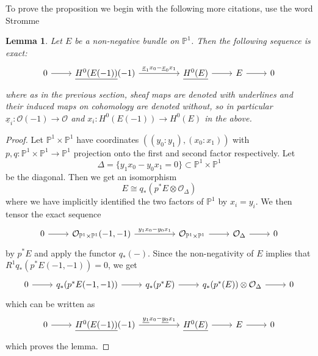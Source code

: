 \documentclass{amsart}
\newtheorem{lemma}[theorem]{Lemma}
\theoremstyle{definition}
\newcommand{\PP}{\mathbb{P}}
\newcommand{\OO}{\mathcal{O}}
\newcommand{\UL}[1]{\underline{#1}}
\begin{document}
To prove the proposition we begin with the following {\color{red} more
citations, use the word Stromme} 
\begin{lemma}\label{lem: Stromme}
Let $E$ be a non-negative bundle on $\PP^{1}$. Then the following
sequence is exact:
\[
\begin{tikzcd}
0\arrow{r} & \UL{H^{0}(E(-1))}(-1)
\arrow{rr}{\UL{x}_{1}x_{0}-\UL{x}_{0}x_{1}}& &
\UL{H^{0}(E)} \arrow{r} & E\arrow[r] & 0
\end{tikzcd}
\]
where as in the previous section, sheaf maps are denoted with
underlines and their induced maps on cohomology are denoted without,
so in particular $\UL{x}_{i}:\OO (-1)\to \OO$ and
$x_{i}:H^{0}(E(-1))\to H^{0}(E)$ in the above.
\end{lemma}
\begin{proof}
Let $\PP^{1}\times \PP^{1}$ have coordinates
$((y_{0}:y_{1}),(x_{0}:x_{1}))$ with $p,q:\PP^{1}\times \PP^{1}\to
\PP^{1}$ projection onto the first and second factor respectively. Let 
\[
\Delta =\{y_{1}x_{0}-y_{0}x_{1} =0 \}\subset \PP^{1}\times \PP^{1}
\]
be the diagonal. Then we get an isomorphism
\[
E\cong q_{*}\left(p^{*}E\otimes \OO_{\Delta} \right)
\]
where we have implicitly identified the two factors of $\PP^{1}$ by
$x_{i}=y_{i}$.  We then tensor the exact sequence
\[
\begin{tikzcd}
0\arrow[r] & \OO_{\PP^{1}\times \PP^{1}}(-1,-1)
\arrow{rr}{y_{1}x_{0}-y_{0}x_{1}}& & \OO_{\PP^{1}\times \PP^{1}}
\arrow[r]& \OO_{\Delta} \arrow[r]& 0
\end{tikzcd}
\]
by $p^{*}E$ and apply the functor $q_{*}(-)$. Since the non-negativity
of $E$ implies that $R^{1}q_{*}(p^{*}E(-1,-1))=0$, we get
\[
\begin{tikzcd}
0\arrow[r] &q_{*}(p^{*}E(-1,-1)) \arrow[r] & q_{*}(p^{*}E) \arrow[r] &
q_{*}(p^{*}(E))\otimes \OO_{\Delta} \arrow[r] & 0 
\end{tikzcd}
\]
which can be written as 
\[
\begin{tikzcd}
0\arrow[r] &\UL{H^{0}(E(-1))}(-1)
\arrow{rr}{\UL{y_{1}}x_{0}-\UL{y_{0}}x_{1}} && \UL{H^{0}(E)} \arrow[r]
&E \arrow[r] &0
\end{tikzcd}
\]
which proves the lemma.
\end{proof}
\end{document}
